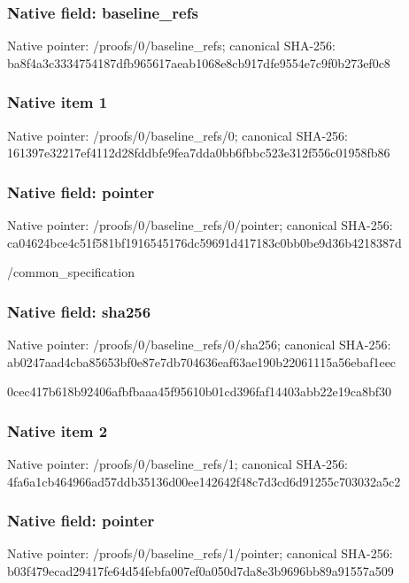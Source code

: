 \documentclass[10pt,a4paper]{article}
\begin{document}
\subsubsection{Native field: baseline\_\allowbreak{}refs}
Native pointer: /proofs/0/baseline\_\allowbreak{}refs; canonical SHA-256: ba8f4a3c3334754187dfb965617aeab1068e8cb917dfe9554e7c9f0b273ef0c8

\subsubsection{Native item 1}
Native pointer: /proofs/0/baseline\_\allowbreak{}refs/0; canonical SHA-256: 161397e32217ef4112d28fddbfe9fea7dda0bb6fbbc523e312f556c01958fb86

\subsubsection{Native field: pointer}
Native pointer: /proofs/0/baseline\_\allowbreak{}refs/0/pointer; canonical SHA-256: ca04624bce4c51f581bf1916545176dc59691d417183c0bb0be9d36b4218387d

\begingroup\raggedright\sloppy /\allowbreak{}common\_\allowbreak{}specification\par\endgroup

\subsubsection{Native field: sha256}
Native pointer: /proofs/0/baseline\_\allowbreak{}refs/0/sha256; canonical SHA-256: ab0247aad4cba85653bf0e87e7db704636eaf63ae190b22061115a56ebaf1eec

\begingroup\raggedright\sloppy 0cec417b618b92406afbfbaaa45f95610b01cd396faf14403abb22e19ca8bf30\par\endgroup

\subsubsection{Native item 2}
Native pointer: /proofs/0/baseline\_\allowbreak{}refs/1; canonical SHA-256: 4fa6a1cb464966ad57ddb35136d00ee142642f48c7d3cd6d91255c703032a5c2

\subsubsection{Native field: pointer}
Native pointer: /proofs/0/baseline\_\allowbreak{}refs/1/pointer; canonical SHA-256: b03f479ecad29417fe64d54febfa007ef0a050d7da8e3b9696bb89a91557a509
\end{document}
